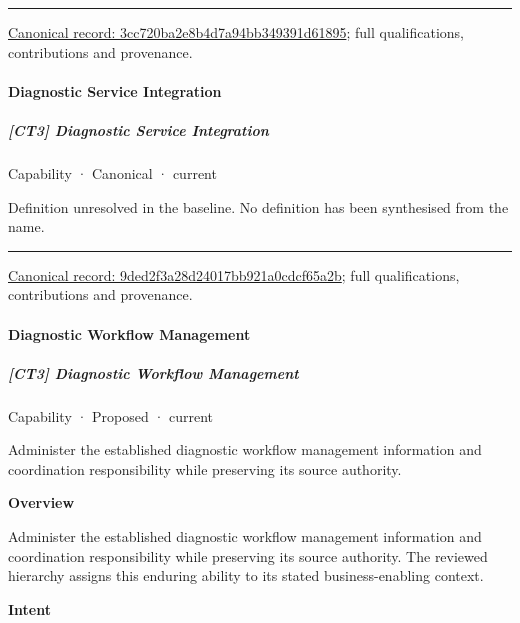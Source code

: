 \medskip\hrule\medskip

{\footnotesize \href{../../../../continuum/strategy/capability/3cc720ba2e8b4d7a94bb349391d61895.md}{Canonical record: 3cc720ba2e8b4d7a94bb349391d61895}; full qualifications, contributions and provenance.}\par
\paragraph{Diagnostic Service Integration}

\subparagraph{[CT3] Diagnostic Service Integration}

\label{element:9ded2f3a28d24017bb921a0cdcf65a2b}
{\small Capability · Canonical · current}\par

Definition unresolved in the baseline. No definition has been synthesised from the name.



\medskip\hrule\medskip

{\footnotesize \href{../../../../continuum/strategy/capability/9ded2f3a28d24017bb921a0cdcf65a2b.md}{Canonical record: 9ded2f3a28d24017bb921a0cdcf65a2b}; full qualifications, contributions and provenance.}\par
\paragraph{Diagnostic Workflow Management}

\subparagraph{[CT3] Diagnostic Workflow Management}

\label{element:270ed0e32b294458aa52cf57df7e55db}
{\small Capability · Proposed · current}\par

Administer the established diagnostic workflow management information and coordination responsibility while preserving its source authority.



\textbf{Overview}



Administer the established diagnostic workflow management information and coordination responsibility while preserving its source authority. The reviewed hierarchy assigns this enduring ability to its stated business-enabling context.



\textbf{Intent}



